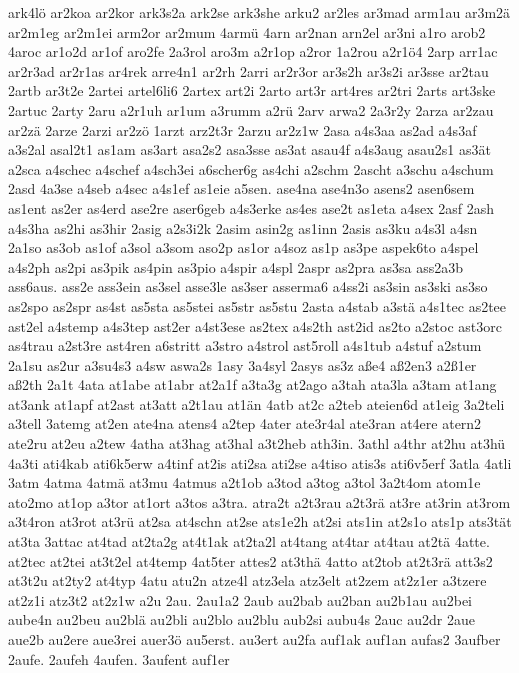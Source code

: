 {ark4lö
ar2koa
ar2kor
ark3s2a
ark2se
ark3she
arku2
ar2les
ar3mad
arm1au
ar3m2ä
ar2m1eg
ar2m1ei
arm2or
ar2mum
4armü
4arn
ar2nan
arn2el
ar3ni
a1ro
arob2
4aroc
ar1o2d
ar1of
aro2fe
2a3rol
aro3m
a2r1op
a2ror
1a2rou
a2r1ö4
2arp
arr1ac
ar2r3ad
ar2r1as
ar4rek
arre4n1
ar2rh
2arri
ar2r3or
ar3s2h
ar3s2i
ar3sse
ar2tau
2artb
ar3t2e
2artei
artel6li6
2artex
art2i
2arto
art3r
art4res
ar2tri
2arts
art3ske
2artuc
2arty
2aru
a2r1uh
ar1um
a3rumm
a2rü
2arv
arwa2
2a3r2y
2arza
ar2zau
ar2zä
2arze
2arzi
ar2zö
1arzt
arz2t3r
2arzu
ar2z1w
2asa
a4s3aa
as2ad
a4s3af
a3s2al
asal2t1
as1am
as3art
asa2s2
asa3sse
as3at
asau4f
a4s3aug
asau2s1
as3ät
a2sca
a4schec
a4schef
a4sch3ei
a6scher6g
as4chi
a2schm
2ascht
a3schu
a4schum
2asd
4a3se
a4seb
a4sec
a4s1ef
as1eie
a5sen.
ase4na
ase4n3o
asens2
asen6sem
as1ent
as2er
as4erd
ase2re
aser6geb
a4s3erke
as4es
ase2t
as1eta
a4sex
2asf
2ash
a4s3ha
as2hi
as3hir
2asig
a2s3i2k
2asim
asin2g
as1inn
2asis
as3ku
a4s3l
a4sn
2a1so
as3ob
as1of
a3sol
a3som
aso2p
as1or
a4soz
as1p
as3pe
aspek6to
a4spel
a4s2ph
as2pi
as3pik
as4pin
as3pio
a4spir
a4spl
2aspr
as2pra
as3sa
ass2a3b
ass6aus.
ass2e
ass3ein
as3sel
asse3le
as3ser
asserma6
a4ss2i
as3sin
as3ski
as3so
as2spo
as2spr
as4st
as5sta
as5stei
as5str
as5stu
2asta
a4stab
a3stä
a4s1tec
as2tee
ast2el
a4stemp
a4s3tep
ast2er
a4st3ese
as2tex
a4s2th
ast2id
as2to
a2stoc
ast3orc
as4trau
a2st3re
ast4ren
a6stritt
a3stro
a4strol
ast5roll
a4s1tub
a4stuf
a2stum
2a1su
as2ur
a3su4s3
a4sw
aswa2s
1asy
3a4syl
2asys
as3z
aße4
aß2en3
a2ß1er
aß2th
2a1t
4ata
at1abe
at1abr
at2a1f
a3ta3g
at2ago
a3tah
ata3la
a3tam
at1ang
at3ank
at1apf
at2ast
at3att
a2t1au
at1än
4atb
at2c
a2teb
ateien6d
at1eig
3a2teli
a3tell
3atemg
at2en
ate4na
atens4
a2tep
4ater
ate3r4al
ate3ran
at4ere
atern2
ate2ru
at2eu
a2tew
4atha
at3hag
at3hal
a3t2heb
ath3in.
3athl
a4thr
at2hu
at3hü
4a3ti
ati4kab
ati6k5erw
a4tinf
at2is
ati2sa
ati2se
a4tiso
atis3s
ati6v5erf
3atla
4atli
3atm
4atma
4atmä
at3mu
4atmus
a2t1ob
a3tod
a3tog
a3tol
3a2t4om
atom1e
ato2mo
at1op
a3tor
at1ort
a3tos
a3tra.
atra2t
a2t3rau
a2t3rä
at3re
at3rin
at3rom
a3t4ron
at3rot
at3rü
at2sa
at4schn
at2se
ats1e2h
at2si
ats1in
at2s1o
ats1p
ats3tät
at3ta
3attac
at4tad
at2ta2g
at4t1ak
at2ta2l
at4tang
at4tar
at4tau
at2tä
4atte.
at2tec
at2tei
at3t2el
at4temp
4at5ter
attes2
at3thä
4atto
at2tob
at2t3rä
att3s2
at3t2u
at2ty2
at4typ
4atu
atu2n
atze4l
atz3ela
atz3elt
at2zem
at2z1er
a3tzere
at2z1i
atz3t2
at2z1w
a2u
2au.
2au1a2
2aub
au2bab
au2ban
au2b1au
au2bei
aube4n
au2beu
au2blä
au2bli
au2blo
au2blu
aub2si
aubu4s
2auc
au2dr
2aue
aue2b
au2ere
aue3rei
auer3ö
au5erst.
au3ert
au2fa
auf1ak
auf1an
aufas2
3aufber
2aufe.
2aufeh
4aufen.
3aufent
auf1er
}
